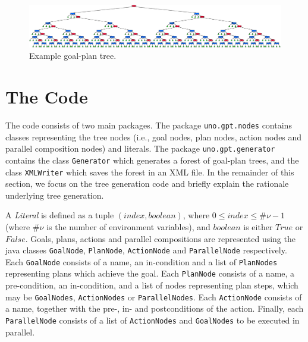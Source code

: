 \documentclass[11pt, a4paper]{article}
\begin{document}
\begin{figure}[!h]
\centering
\includegraphics[width=1\textwidth]{example-gpt}
\caption{Example goal-plan tree.}
\label{fig:gpt}
\end{figure}



\section{The Code}
\label{sec:code}

The code consists of two main packages.
The package \texttt{uno.gpt.nodes} contains classes representing the tree nodes (i.e., goal nodes, plan nodes, action nodes and parallel composition nodes) and literals. The package \texttt{uno.gpt.generator} contains the class \texttt{Generator} which generates a forest of goal-plan trees, and the class \texttt{XMLWriter} which saves the forest in an XML file. In the remainder of this section, we focus on the tree generation code and briefly explain the rationale underlying tree generation.

A \textit{Literal} is defined as a tuple $(index, boolean)$, where $0 \leq index \leq \#\nu -1$ (where $\#\nu$ is the number of environment variables), and $boolean$ is either $True$ or  $False$. Goals, plans, actions and parallel compositions are represented using the java classes \texttt{GoalNode}, \texttt{PlanNode}, \texttt{ActionNode} and  \texttt{ParallelNode} respectively. Each \texttt{GoalNode} consists of a name, an in-condition and a list of \texttt{PlanNodes} representing plans which achieve the goal. Each \texttt{PlanNode} consists of a name, a pre-condition, an in-condition, and a list of nodes representing plan steps, which may be \texttt{GoalNodes}, \texttt{ActionNodes} or \texttt{ParallelNodes}. Each \texttt{ActionNode} consists of a name, together with the pre-, in- and postconditions of the action. Finally, each \texttt{ParallelNode} consists of a list of \texttt{ActionNodes} and \texttt{GoalNodes} to be executed in parallel.
\end{document}
